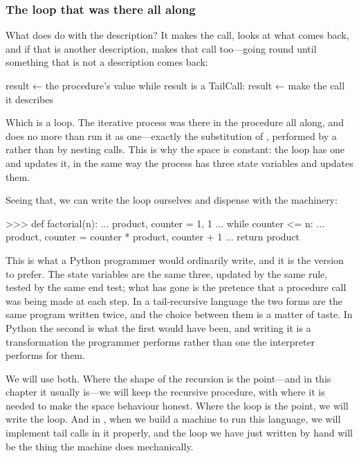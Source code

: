 \subsubsection*{The loop that was there all along}

What does  do with the description?  It makes the call,
looks at what comes back, and if that is another description, makes that call
too---going round until something that is not a description comes back:

\begin{syntaxForm}
result ← the procedure's value
while result is a TailCall:
    result ← make the call it describes
\end{syntaxForm}

\noindent
Which is a loop.  The iterative process was there in the procedure all along,
and  does no more than run it as one---exactly the
substitution of , performed by a  rather than
by nesting calls.  This is why the space is constant: the loop has one
 and updates it, in the same way the process has three state
variables and updates them.

Seeing that, we can write the loop ourselves and dispense with the machinery:

\begin{codeBlock}
>>> def factorial(n):
...     product, counter = 1, 1
...     while counter <= n:
...         product, counter = counter * product, counter + 1
...     return product
\end{codeBlock}

\noindent
This is what a Python programmer would ordinarily write, and it is the version
to prefer.  The state variables are the same three, updated by the same rule,
tested by the same end test; what has gone is the pretence that a procedure
call was being made at each step.  In a tail-recursive language the two forms
are the same program written twice, and the choice between them is a matter of
taste.  In Python the second is what the first would have been, and writing it
is a transformation the programmer performs rather than one the interpreter
performs for them.

We will use both.  Where the shape of the recursion is the point---and in this
chapter it usually is---we will keep the recursive procedure, with
 where it is needed to make the space behaviour honest.  Where
the loop is the point, we will write the loop.  And in , when
we build a machine to run this language, we will implement tail calls in it
properly, and the loop we have just written by hand will be the thing the
machine does mechanically.

